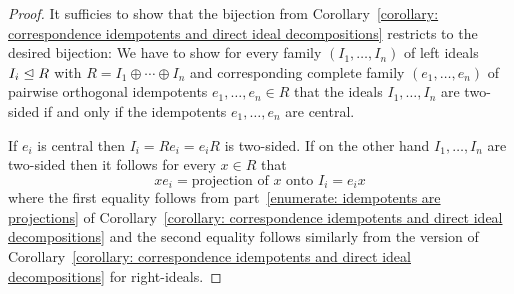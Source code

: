 \begin{proof}
  It sufficies to show that the bijection from Corollary~\ref{corollary: correspondence idempotents and direct ideal decompositions} restricts to the desired bijection:
  We have to show for every family $(I_1, \dotsc, I_n)$ of left ideals $I_i \trianglelefteq R$ with $R = I_1 \oplus \dotsb \oplus I_n$ and corresponding complete family $(e_1, \dotsc, e_n)$ of pairwise orthogonal idempotents $e_1, \dotsc, e_n \in R$ that the ideals $I_1, \dotsc, I_n$ are two-sided if and only if the idempotents $e_1, \dotsc, e_n$ are central.
  
  If $e_i$ is central then $I_i = R e_i = e_i R$ is two-sided.
  If on the other hand $I_1, \dotsc, I_n$ are two-sided then it follows for every $x \in R$ that
  \[
      x e_i
    = \text{projection of $x$ onto $I_i$}
    = e_i x
  \]
  where the first equality follows from part~\ref*{enumerate: idempotents are projections} of Corollary~\ref{corollary: correspondence idempotents and direct ideal decompositions} and the second equality follows similarly from the version of Corollary~\ref{corollary: correspondence idempotents and direct ideal decompositions} for right-ideals.
\end{proof}








